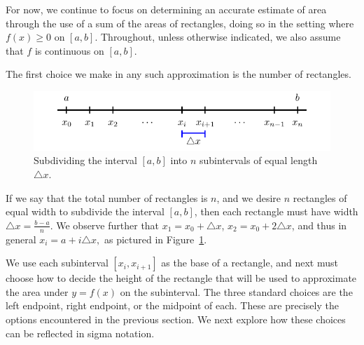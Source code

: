 For now, we continue to focus on determining an accurate estimate of area through the use of a sum of the areas of rectangles, doing so in the setting where $f(x) \ge 0$ on $[a,b]$.  Throughout, unless otherwise indicated, we also assume that $f$ is continuous on $[a,b]$.

The first choice we make in any such approximation is the number of rectangles.  
\begin{figure}[h]
\begin{center}
\includegraphics{figures/4_2_Interval}
\caption{Subdividing the interval $[a,b]$ into $n$ subintervals of equal length $\triangle x$.} \label{F:4.2.Interval}
\end{center}
\end{figure}
If we say that the total number of rectangles is $n$, and we desire $n$ rectangles of equal width to subdivide the interval $[a,b]$, then each rectangle must have width $\triangle x = \frac{b-a}{n}$. We observe further that $x_1 = x_0 + \triangle x$, $x_2 = x_0 + 2 \triangle x$, and thus in general $x_{i} = a + i\triangle x,$ as pictured in Figure~\ref{F:4.2.Interval}.

We use each subinterval $[x_i, x_{i+1}]$ as the base of a rectangle, and next must choose how to decide the height of the rectangle that will be used to approximate the area under $y = f(x)$ on the subinterval.  The three standard choices are the left endpoint, right endpoint, or the midpoint of each.  These are precisely the options encountered in the previous section.  We next explore how these choices can be reflected in sigma notation.


